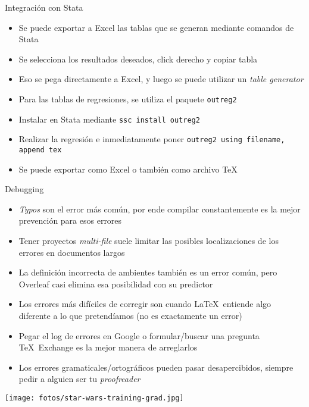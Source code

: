 \documentclass{beamer}
\begin{document}
\begin{frame}{Integración con Stata}
\begin{itemize}
    \item Se puede exportar a Excel las tablas que se generan mediante comandos de Stata
    \item Se selecciona los resultados deseados, click derecho y copiar tabla
    \item Eso se pega directamente a Excel, y luego se puede utilizar un \textit{table generator}
    \item Para las tablas de regresiones, se utiliza el paquete  \texttt{outreg2}
    \item Instalar en Stata mediante \texttt{ssc install outreg2}
    \item Realizar la regresión e inmediatamente poner \texttt{outreg2 using filename, append tex}
    \item Se puede exportar como Excel o también como archivo \TeX
\end{itemize}
\end{frame}
\begin{frame}{Debugging}
\begin{itemize}
\item \textit{Typos} son el error más común, por ende compilar constantemente es la mejor prevención para esos errores
    \item Tener proyectos \textit{multi-file} suele limitar las posibles localizaciones de los errores en documentos largos
    \item La definición incorrecta de ambientes también es un error común, pero Overleaf casi elimina esa posibilidad con su predictor
    \item Los errores más difíciles de corregir son cuando \LaTeX\ entiende algo diferente a lo que pretendíamos (no es exactamente un error)
    \item Pegar el log de errores en Google o formular/buscar una pregunta \TeX \ Exchange es la mejor manera de arreglarlos
    \item Los errores gramaticales/ortográficos pueden pasar desapercibidos, siempre pedir a alguien ser tu \textit{proofreader}
\end{itemize}
\end{frame}
\begin{frame}
\centering
 \texttt{[image: fotos/star-wars-training-grad.jpg]}
\end{frame}
\end{document}
